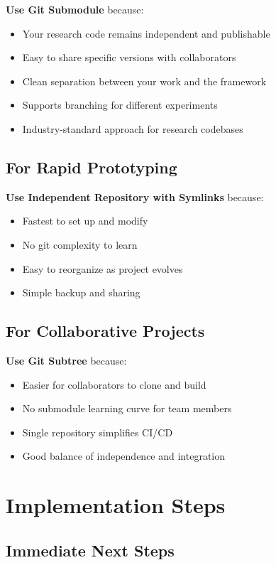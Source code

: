 \documentclass[11pt,a4paper]{article}
\begin{document}
\textbf{Use Git Submodule} because:
\begin{itemize}
\item Your research code remains independent and publishable
\item Easy to share specific versions with collaborators
\item Clean separation between your work and the framework
\item Supports branching for different experiments
\item Industry-standard approach for research codebases
\end{itemize}

\subsection{For Rapid Prototyping}

\textbf{Use Independent Repository with Symlinks} because:
\begin{itemize}
\item Fastest to set up and modify
\item No git complexity to learn
\item Easy to reorganize as project evolves
\item Simple backup and sharing
\end{itemize}

\subsection{For Collaborative Projects}

\textbf{Use Git Subtree} because:
\begin{itemize}
\item Easier for collaborators to clone and build
\item No submodule learning curve for team members
\item Single repository simplifies CI/CD
\item Good balance of independence and integration
\end{itemize}

\section{Implementation Steps}

\subsection{Immediate Next Steps}
\end{document}
